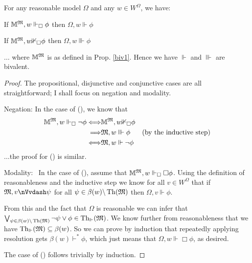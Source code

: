 \begin{proposition}
  For any reasonable model $\Omega$ and any $w \in W^{\Omega}$, we have:
  \begin{enumerateroman}
    \item If $\mathbbm{M}^{\Omega}, w \Vdash_{\Box} \phi$ then $\Omega, w
    \Vdash \phi$
    
    \item If $\mathbbm{M}^{\Omega}, w {\nVdash}_{\Box} \phi$ then $\Omega,
    w \Vvdash \phi$
  \end{enumerateroman}
  $\ldots$ where $\mathbbm{M}^{\Omega}$ is as defined in Prop.  \ref{biv1}.  
  Hence we have $\Vdash$ and $\Vvdash$ are bivalent.
\end{proposition}

\begin{proof}
  The propositional, disjunctive and conjunctive cases are all
  straightforward; I shall focus on negation and modality.
  
  Negation: In the case of (), we know that \
  \begin{eqnarray}
    \mathbbm{M}^{\Omega}, w \Vdash_{\Box} \neg \phi \Longleftrightarrow &
    \mathbbm{M}^{\Omega}, w {\nVdash}_{\Box} \phi &  \nonumber\\
    \Longrightarrow & \Omega, w \Vvdash \phi & \text{(by the inductive step)}
    \nonumber\\
    \Longleftrightarrow & \Omega, w \Vdash \neg \phi &  \nonumber
  \end{eqnarray}
  $\ldots$the proof for () is similar.
  
  Modality: \ In the case of (), assume that
  $\mathbbm{M}^{\Omega}, w \Vdash_{\Box} \Box \phi$. Using the definition of
  reasonableness and the inductive step we know for all $v \in W^{\Omega}$
  that if $\Omega, v {\nVvdash} \psi$ for all $\psi \in \beta (w)
  \backslash \tmop{Th} (\Omega)$ then $\Omega, v \Vdash \phi$.
  
  From this and the fact that $\Omega$ is reasonable we can infer that
  $\bigvee_{\psi \in \beta (w) \backslash \tmop{Th} (\Omega)} \neg \psi \vee
  \phi \in \tmop{Th}_{\Vdash} (\Omega)$.   We know further from reasonableness
  that we have $\tmop{Th}_{\Vdash} (\Omega) \subseteq \beta (w)$. So we can
  prove by induction that repeatedly applying resolution gets $\beta (w)
  \vdash^{\ast} \phi$, which just means that $\Omega, w \Vdash \Box \phi$, as
  desired.
  
  The case of () follows trivially by induction.
\end{proof}

